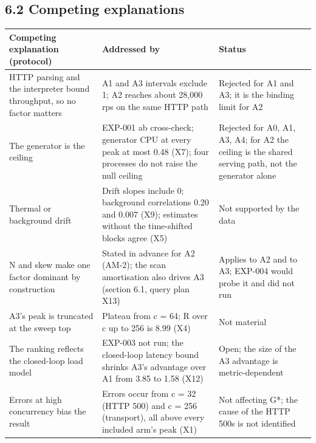 \documentclass[
]{article}
\begin{document}
\subsection{6.2 Competing explanations}\label{competing-explanations}

\begin{longtable}[]{@{}
  >{\raggedright\arraybackslash}p{}
  >{\raggedright\arraybackslash}p{}
  >{\raggedright\arraybackslash}p{}@{}}
\toprule\noalign{}
\begin{minipage}[b]{\linewidth}\raggedright
Competing explanation (protocol)
\end{minipage} & \begin{minipage}[b]{\linewidth}\raggedright
Addressed by
\end{minipage} & \begin{minipage}[b]{\linewidth}\raggedright
Status
\end{minipage} \\
\midrule\noalign{}
\endhead
\bottomrule\noalign{}
\endlastfoot
HTTP parsing and the interpreter bound throughput, so no factor matters
& A1 and A3 intervals exclude 1; A2 reaches about 28,000 rps on the same
HTTP path & Rejected for A1 and A3; it is the binding limit for A2 \\
The generator is the ceiling & EXP-001 ab cross-check; generator CPU at
every peak at most 0.48 (X7); four processes do not raise the null
ceiling & Rejected for A0, A1, A3, A4; for A2 the ceiling is the shared
serving path, not the generator alone \\
Thermal or background drift & Drift slopes include 0; background
correlations 0.20 and 0.007 (X9); estimates without the time-shifted
blocks agree (X5) & Not supported by the data \\
N and skew make one factor dominant by construction & Stated in advance
for A2 (AM-2); the scan amortisation also drives A3 (section 6.1, query
plan X13) & Applies to A2 and to A3; EXP-004 would probe it and did not
run \\
A3's peak is truncated at the sweep top & Plateau from c = 64; R over c
up to 256 is 8.99 (X4) & Not material \\
The ranking reflects the closed-loop load model & EXP-003 not run; the
closed-loop latency bound shrinks A3's advantage over A1 from 3.85 to
1.58 (X12) & Open; the size of the A3 advantage is metric-dependent \\
Errors at high concurrency bias the result & Errors occur from c = 32
(HTTP 500) and c = 256 (transport), all above every included arm's peak
(X1) & Not affecting G*; the cause of the HTTP 500s is not identified \\
\end{longtable}
\end{document}
